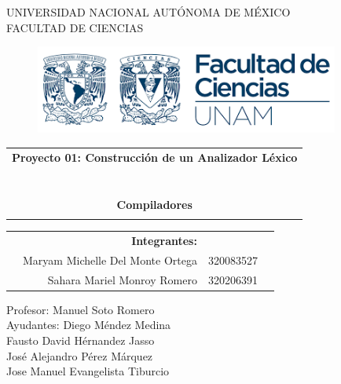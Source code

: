 \begin{titlepage}
\begin{center}
UNIVERSIDAD NACIONAL AUTÓNOMA DE MÉXICO\\
FACULTAD DE CIENCIAS \\

\end{center}
\vspace{1 cm}
\begin{figure}[h!]
\begin{center}
\includegraphics[width=10cm]{resources/images.png}
\end{center}
\end{figure}
\vspace{1.5 cm}
\begin{center}
\begin{tabular}{c}
\multicolumn{1}{c}{\textbf{{\LARGE Proyecto 01: Construcción de un Analizador Léxico}}}\\
~~\\
\\
\hline
\\
\multicolumn{1}{c}{\textbf{{\Large Compiladores}}}\\
\\
\hline
\end{tabular}
\end{center}

\vspace{4cm}

\begin{table}[h]
\begin{tabular}{rrll}
\hspace{3cm}
& \textbf{\Large Integrantes:} &\\
& Maryam Michelle Del Monte Ortega & 320083527 \\
& Sahara Mariel Monroy Romero & 320206391 \\


\end{tabular}
\end{table}

\vspace{4cm}

\begin{center}
Profesor: Manuel Soto Romero\\
Ayudantes: Diego Méndez Medina\\
Fausto David Hérnandez Jasso\\
José Alejandro Pérez Márquez\\
Jose Manuel Evangelista Tiburcio
\end{center}

\end{titlepage}



\newpage